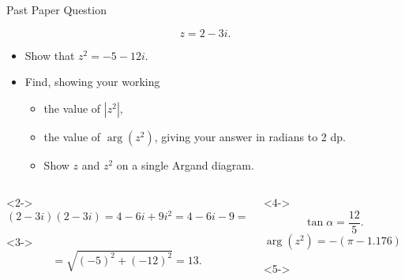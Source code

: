 \documentclass[8pt]{beamer}
\begin{document}
\begin{frame}{Past Paper Question}
	\begin{problem}
		\[
		z=2-3i
		.\] 
		\begin{itemize}
			\item Show that $z^2=-5-12i$.
			\item Find, showing your working
				\begin{itemize}
					\item the value of $|z^2|$,
					\item the value of $\arg(z^2)$, giving your answer in radians to 2 dp.
					\item Show $z$ and $z^2$ on a single Argand diagram.
				\end{itemize}
		\end{itemize}
	\end{problem}

	\begin{columns}[T]
	\begin{column}{.5\linewidth}
	\begin{solution}<2->
	    $
		    (2-3i)(2-3i)=4-6i+9i^2=4-6i-9=-5-12i
	$ 
	\end{solution}
	\begin{solution}<3->
		\[
			=\sqrt{(-5)^2+(-12)^2}=13 
		.\] 
	\end{solution}
	\end{column}
	\begin{column}{.5\linewidth}
	\begin{solution}<4->
		\[
		\tan \alpha = \frac{12}{5}
		.\] 
		\[
			\arg(z^2)=-(\pi-1.176)=-1.97
		.\] 
	\end{solution}
	\begin{solution}<5->
		
	\begin{center}
\end{center}
	\end{solution}
	\end{column}
	\end{columns}
\end{frame}
\end{document}

